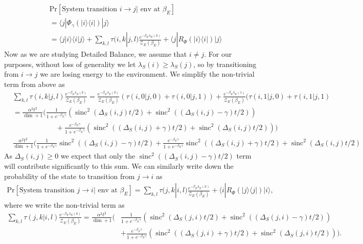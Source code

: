 \documentclass{article}
\newcommand{\ket}[1]{|#1\rangle}
\newcommand{\bra}[1]{\langle #1|}
\newcommand{\braket}[2]{\langle #1|#2\rangle}
\newcommand{\ketbra}[2]{| #1\rangle\! \langle #2|}
\newcommand{\prob}[1]{\text{Pr}\left[ #1 \right]}
\newcommand{\partfun}{\mathcal{Z}}
\DeclareMathOperator{\sinc}{sinc}
\begin{document}
\begin{align}
    &\prob{\text{System transition } i \to j | \text{ env at } \beta_E} \nonumber \\
    &= \bra{j} \Phi_{\gamma}(\ketbra{i}{i}) \ket{j} \\
    &= \braket{j}{i}\braket{i}{j} + \sum_{k,l} \tau(i, k | j, l) \frac{e^{-\beta_E \lambda_E(k)}}{\partfun_E(\beta_E)} + \bra{j} R_{\Phi}(\ketbra{i}{i})\ket{j}
\end{align}
Now as we are studying Detailed Balance, we assume that $i \neq j$. For our purposes, without loss of generality we let $\lambda_S(i) \geq \lambda_S(j)$, so by transitioning from $i \to j$ we are losing energy to the environment. We simplify the non-trivial term from above as
\begin{align}
    &\sum_{k,l} \tau(i,k| j,l) \frac{e^{-\beta_E \lambda_E(k)}}{\partfun_E(\beta_E)} = \frac{e^{-\beta_E \lambda_E(0)}}{\partfun_E(\beta_E)}(\tau(i,0|j,0) + \tau(i,0|j,1)) + \frac{e^{-\beta_E \lambda_E(1)}}{\partfun_E(\beta_E)} (\tau(i,1|j,0) + \tau(i,1|j,1) \\
    &= \frac{\alpha^2 t^2}{\dim + 1} \bigg(\frac{1}{1 + e^{-\beta_E \gamma}} (\sinc^2(\Delta_S(i,j)t/2) + \sinc^2((\Delta_S(i,j) - \gamma)t/2)) \nonumber \\
    &\quad \quad \quad \quad \quad \quad  +\frac{e^{-\beta_E \gamma}}{1 + e^{-\beta_E \gamma}} (\sinc^2((\Delta_S(i,j) + \gamma)t/2) + \sinc^2(\Delta_S(i,j) t/2)) \bigg) \\
    &\frac{\alpha^2 t^2}{\dim + 1} \bigg(\frac{1}{1 + e^{-\beta_E \gamma}} \sinc^2((\Delta_S(i,j) - \gamma)t/2) + \frac{e^{-\beta_E \gamma}}{1 + e^{-\beta_E \gamma}} \sinc^2((\Delta_S(i,j) + \gamma)t/2) + \sinc^2(\Delta_S(i,j)t/2)
\end{align}
As $\Delta_S(i,j) \geq 0 $ we expect that only the $\sinc^2((\Delta_S(i,j) - \gamma) t/2)$ term will contribute significantly to this sum. We can similarly write down the probability of the state to transition from $j \to i$ as
\begin{align}
    \prob{\text{System transition } j \to i | \text{ env at } \beta_E} = \sum_{k,l} \tau(j,k|i,l) \frac{e^{-\beta_E \lambda_E(k)}}{\partfun_E(\beta_E)} + \bra{i} R_{\Phi}(\ketbra{j}{j})\ket{i},
\end{align}
where we write the non-trivial term as
\begin{align}
    \sum_{k,l} \tau(j,k|i,l) \frac{e^{-\beta_E \lambda_E(k)}}{\partfun_E(\beta_E)} = \frac{\alpha^2 t^2}{\dim + 1} \bigg(&\frac{1}{1 + e^{-\beta_E \gamma}} (\sinc^2(\Delta_S(j,i)t/2) + \sinc^2((\Delta_S(j,i) - \gamma)t/2)) \nonumber \\
    &+\frac{e^{-\beta_E \gamma}}{1 + e^{-\beta_E \gamma}} (\sinc^2((\Delta_S(j,i) + \gamma)t/2) + \sinc^2(\Delta_S(j,i) t/2)) \bigg).
\end{align}
\end{document}
